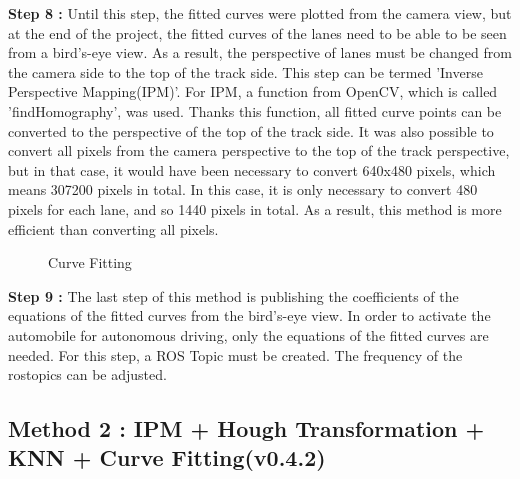  
\textbf{Step 8 : }Until this step, the fitted curves were plotted from the camera view, but at the end of the project, the fitted curves of the lanes need to be able to be seen from a bird's-eye view. As a result, the perspective of lanes must be changed from the camera side to the top of the track side. This step can be termed 'Inverse Perspective Mapping(IPM)'. For IPM, a function from OpenCV, which is called 'findHomography', was used. Thanks this function, all fitted curve points can be converted to the perspective of the top of the track side. It was also possible to convert all pixels from the camera perspective to the top of the track perspective, but in that case, it would have been necessary to convert 640x480 pixels, which means 307200 pixels in total. In this case, it is only necessary to convert 480 pixels for each lane, and so 1440 pixels in total. As a result, this method is more efficient than converting all pixels.
 	 		 	
\begin{figure}[H]
  \centering
  \caption{Curve Fitting}
\end{figure} 


\textbf{Step 9 : }The last step of this method is publishing the coefficients of the equations of the fitted curves from the bird's-eye view. In order to activate the automobile for autonomous driving, only the equations of the fitted curves are needed. For this step, a ROS Topic must be created. The frequency of the rostopics can be adjusted.

%

\subsection{Method 2 : IPM + Hough Transformation + KNN + Curve Fitting(v0.4.2)}\label{sec:Case 2}

